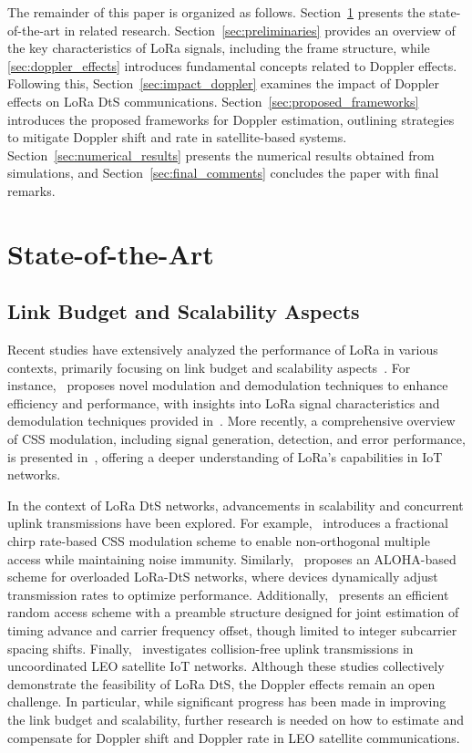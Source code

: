 \documentclass{IEEEtran}
\begin{document}
The remainder of this paper is organized as follows. Section~\ref{sec:SotA} presents the state-of-the-art in related research. Section~\ref{sec:preliminaries} provides an overview of the key characteristics of \ac{LoRa} signals, including the frame structure, while \ref{sec:doppler_effects} introduces fundamental concepts related to Doppler effects. Following this, Section~\ref{sec:impact_doppler} examines the impact of Doppler effects on \ac{LoRa} \ac{DtS} communications. Section~\ref{sec:proposed_frameworks} introduces the proposed frameworks for Doppler estimation, outlining strategies to mitigate Doppler shift and rate in satellite-based systems. Section~\ref{sec:numerical_results} presents the numerical results obtained from simulations, and Section~\ref{sec:final_comments} concludes the paper with final remarks.

\section{State-of-the-Art} 
\label{sec:SotA}

\subsection{Link Budget and Scalability Aspects}

Recent studies have extensively analyzed the performance of \ac{LoRa} in various contexts, primarily focusing on link budget and scalability aspects~\cite{Nguyen.2019, Pasolini.2022, Maleki.2024, Alvarez.2022, Fernandez.2020, Zhang.2024, Alonso.2024, Wu.2024, Testi.2025}. For instance,~\cite{Nguyen.2019} proposes novel modulation and demodulation techniques to enhance efficiency and performance, with insights into \ac{LoRa} signal characteristics and demodulation techniques provided in~\cite{Chiani.2019,Pasolini.2022}. More recently, a comprehensive overview of CSS modulation, including signal generation, detection, and error performance, is presented in~\cite{Maleki.2024}, offering a deeper understanding of \ac{LoRa}'s capabilities in IoT networks.

In the context of \ac{LoRa} \ac{DtS} networks, advancements in scalability and concurrent uplink transmissions have been explored. For example,~\cite{Zhang.2024} introduces a fractional chirp rate-based CSS modulation scheme to enable non-orthogonal multiple access while maintaining noise immunity. Similarly,~\cite{Alonso.2024} proposes an ALOHA-based scheme for overloaded \ac{LoRa}-DtS networks, where devices dynamically adjust transmission rates to optimize performance. Additionally,~\cite{Wu.2024} presents an efficient random access scheme with a preamble structure designed for joint estimation of timing advance and carrier frequency offset, though limited to integer subcarrier spacing shifts. Finally,~\cite{Testi.2025} investigates collision-free uplink transmissions in uncoordinated LEO satellite IoT networks. 
Although these studies collectively demonstrate the feasibility of \ac{LoRa} DtS, the Doppler effects remain an open challenge. In particular, while significant progress has been made in improving the link budget and scalability, further research is needed  on how to estimate and compensate for Doppler shift and Doppler rate in LEO satellite communications.
\end{document}
